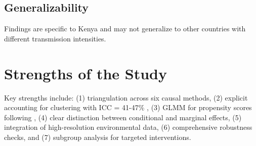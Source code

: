 \subsection{Generalizability}

Findings are specific to Kenya and may not generalize to other countries with different transmission intensities.

\section{Strengths of the Study}

Key strengths include: (1) triangulation across six causal methods, (2) explicit accounting for clustering with ICC = 41-47\% \citep{killip2004intracluster}, (3) GLMM for propensity scores following \citet{ayele2024assessment}, (4) clear distinction between conditional and marginal effects, (5) integration of high-resolution environmental data, (6) comprehensive robustness checks, and (7) subgroup analysis for targeted interventions.